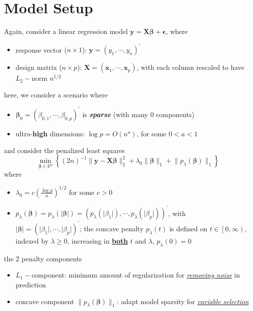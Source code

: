 \documentclass[twoside]{article}
\begin{document}
\section{Model Setup}
Again, consider a linear regression model $\mathbf{y}=\mathbf{X}\boldsymbol{\beta}+\boldsymbol{\epsilon}$, where 
\begin{itemize}
    \item response vector ($n\times 1$): $\mathbf{y} = (y_1,\cdots,y_n)^{\prime}$
    \item design matrix ($n\times p$): $\mathbf{X} = (\mathbf{x}_1,\cdots,\mathbf{x}_p)$, with each column rescaled to have $L_2-$norm $n^{1/2}$
\end{itemize}
here, we consider a scenario where
\begin{itemize}
    \item $\boldsymbol{\beta}_0 = (\beta_{0,1},\cdots,\beta_{0,p})^{\prime}$ is \textit{\textbf{sparse}} (with many 0 components)
    \item ultra-\textbf{high} dimensions: $\log p=O(n^a)$, for some $0<a<1$
\end{itemize}
and consider the penalized least squares 
\begin{equation}\label{eq:penalized-LS-l1concave}
    \min_{\boldsymbol{\beta}\in\mathbb{R}^p}\left\{ (2n)^{-1}\lVert \mathbf{y}-\mathbf{X}\boldsymbol{\beta} \rVert ^2_2 + \lambda_0 \lVert \boldsymbol{\beta} \rVert _1 + \lVert p_{\lambda}(\boldsymbol{\beta}) \rVert _1  \right\}
\end{equation}
where 
\begin{itemize}
    \item $\lambda_0 = c\left(\frac{\log p}{n}\right)^{1/2}$ for some $c>0$
    \item $p_{\lambda}(\boldsymbol{\beta}) = p_{\lambda}(\lvert\boldsymbol{\beta}\rvert ) = (p_{\lambda}(\lvert \beta_1 \rvert),\cdots,p_{\lambda}(\lvert \beta_p \rvert))^{\prime}$, with $\lvert\boldsymbol{\beta} \rvert = (\lvert \beta_1 \rvert,\cdots,\lvert \beta_p \rvert)^{\prime}$; the concave penalty $p_{\lambda}(t)$ is defined on $t\in\left[0,\infty \right)$, indexed by $\lambda\geq 0$, increasing in \textbf{\underline{both}} $t$ and $\lambda$, $p_{\lambda}(0)=0$
\end{itemize}
the 2 penalty components
\begin{itemize}
    \item $L_1-$component: minimum amount of regularization for \underline{\textit{removing noise}} in prediction 
    \item concave component $\lVert p_{\lambda}(\boldsymbol{\beta}) \rVert _1$: adapt model sparsity for \underline{\textit{variable selection}}
\end{itemize}
\end{document}
